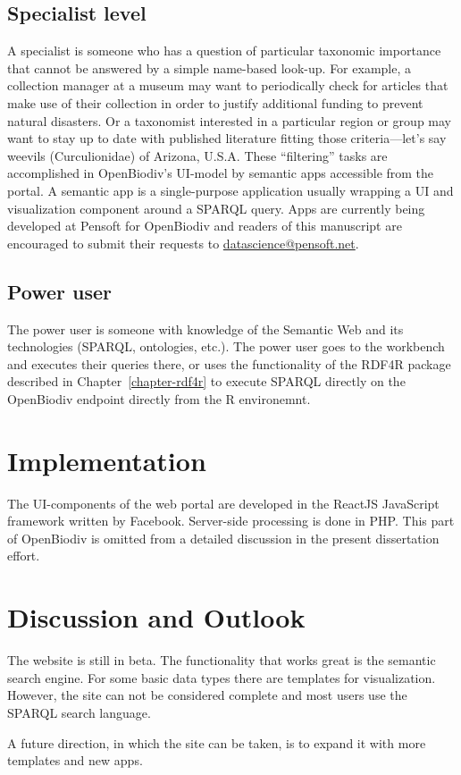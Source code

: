 \subsection{Specialist level}

A specialist is someone who has a question of particular taxonomic importance that cannot be answered by a simple name-based look-up. For example, a collection manager at a museum may want to periodically check for articles that make use of their collection in order to justify additional funding to prevent natural disasters. Or a taxonomist interested in a particular region or group may want to stay up to date with published literature fitting those criteria---let's say weevils (Curculionidae) of Arizona, U.S.A. These ``filtering'' tasks are accomplished in OpenBiodiv's UI-model by semantic apps accessible from the portal. A semantic app is a single-purpose application usually wrapping a UI and visualization component around a SPARQL query. Apps are currently being developed at Pensoft for OpenBiodiv and readers of this manuscript are encouraged to submit their requests to \url{datascience@pensoft.net}.

\subsection{Power user}

The power user is someone with knowledge of the Semantic Web and its technologies (SPARQL, ontologies, etc.). The power user goes to the workbench and executes their queries there, or uses the functionality of the RDF4R package described in Chapter~\ref{chapter-rdf4r} to execute SPARQL directly on the OpenBiodiv endpoint directly from the R environemnt.

\section{Implementation}

The UI-components of the web portal are developed in the ReactJS JavaScript framework written by Facebook. Server-side processing is done in PHP. This part of OpenBiodiv is omitted from a detailed discussion in the present dissertation effort.

\section{Discussion and Outlook}

The website is still in beta. The functionality that works great is the semantic search engine. For some basic data types there are templates for visualization. However, the site can not be considered complete and most users use the SPARQL search language.

A future direction, in which the site can be taken, is to expand it with more templates and new apps.